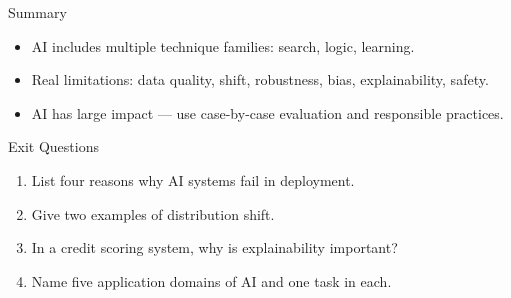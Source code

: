 \documentclass[aspectratio=169]{beamer}
\begin{document}
\begin{frame}{Summary}
  \begin{itemize}
    \item AI includes multiple technique families: search, logic, learning.
    \item Real limitations: data quality, shift, robustness, bias, explainability, safety.
    \item AI has large impact --- use case-by-case evaluation and responsible practices.
  \end{itemize}
  \slidesources{\AIMLUnitISources}
\end{frame}

\begin{frame}{Exit Questions}
  \begin{enumerate}
    \item List four reasons why AI systems fail in deployment.
    \item Give two examples of distribution shift.
    \item In a credit scoring system, why is explainability important?
    \item Name five application domains of AI and one task in each.
  \end{enumerate}
\end{frame}
\end{document}
